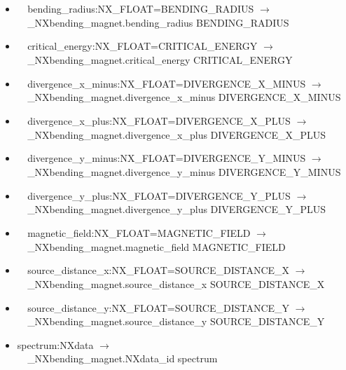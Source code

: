 \documentclass[11pt]{article}
\begin{document}
{{\begin{itemize}
\item{\verb|  |bending\_radius:NX\_FLOAT=BENDING\_RADIUS $\rightarrow$\\
\verb|  |\_NXbending\_magnet.bending\_radius BENDING\_RADIUS}

\item{\verb|  |critical\_energy:NX\_FLOAT=CRITICAL\_ENERGY $\rightarrow$\\
\verb|  |\_NXbending\_magnet.critical\_energy CRITICAL\_ENERGY}

\item{\verb|  |divergence\_x\_minus:NX\_FLOAT=DIVERGENCE\_X\_MINUS $\rightarrow$\\
\verb|  |\_NXbending\_magnet.divergence\_x\_minus DIVERGENCE\_X\_MINUS}

\item{\verb|  |divergence\_x\_plus:NX\_FLOAT=DIVERGENCE\_X\_PLUS $\rightarrow$\\
\verb|  |\_NXbending\_magnet.divergence\_x\_plus DIVERGENCE\_X\_PLUS}

\item{\verb|  |divergence\_y\_minus:NX\_FLOAT=DIVERGENCE\_Y\_MINUS $\rightarrow$\\
\verb|  |\_NXbending\_magnet.divergence\_y\_minus DIVERGENCE\_Y\_MINUS}

\item{\verb|  |divergence\_y\_plus:NX\_FLOAT=DIVERGENCE\_Y\_PLUS $\rightarrow$\\
\verb|  |\_NXbending\_magnet.divergence\_y\_plus DIVERGENCE\_Y\_PLUS}

\item{\verb|  |magnetic\_field:NX\_FLOAT=MAGNETIC\_FIELD $\rightarrow$\\
\verb|  |\_NXbending\_magnet.magnetic\_field MAGNETIC\_FIELD}

\item{\verb|  |source\_distance\_x:NX\_FLOAT=SOURCE\_DISTANCE\_X $\rightarrow$\\
\verb|  |\_NXbending\_magnet.source\_distance\_x SOURCE\_DISTANCE\_X}

\item{\verb|  |source\_distance\_y:NX\_FLOAT=SOURCE\_DISTANCE\_Y $\rightarrow$\\
\verb|  |\_NXbending\_magnet.source\_distance\_y SOURCE\_DISTANCE\_Y}

\item{spectrum:NXdata $\rightarrow$\\
\verb|  |\_NXbending\_magnet.NXdata\_id spectrum}


\end{itemize}}}
\end{document}
